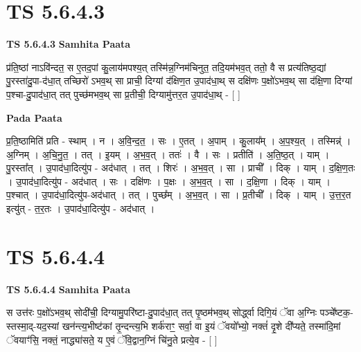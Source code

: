 \documentclass[17pt]{extarticle}
\begin{document}

\section{ TS 5.6.4.3 }

\textbf{TS 5.6.4.3 } \newline
\textbf{Samhita Paata} \newline

प्र॑ति॒ष्ठां नाऽवि॑न्दत॒ स ए॒तद॒पां कु॒लाय॑मपश्य॒त् तस्मि॑न्न॒ग्निम॑चिनुत॒ तदि॒यम॑भव॒त् ततो॒ वै स प्रत्य॑तिष्ठ॒द्यां पु॒रस्ता॑दु॒पा-द॑धा॒त् तच्छिरो॑ ऽभव॒थ् सा प्राची॒ दिग्यां द॑क्षिण॒त उ॒पाद॑धा॒थ् स दक्षि॑णः प॒क्षो॑ऽभव॒थ् सा द॑क्षि॒णा दिग्यां प॒श्चा-दु॒पाद॑धा॒त् तत् पुच्छ॑मभव॒थ् सा प्र॒तीची॒ दिग्यामु॑त्तर॒त उ॒पाद॑धा॒थ् - [  ] \newline

\textbf{Pada Paata} \newline

प्र॒ति॒ष्ठामिति॑ प्रति - स्थाम् । न । अ॒वि॒न्द॒त॒ । सः । ए॒तत् । अ॒पाम् । कु॒लाय᳚म् । अ॒प॒श्य॒त् । तस्मिन्न्॑ । अ॒ग्निम् । अ॒चि॒नु॒त॒ । तत् । इ॒यम् । अ॒भ॒व॒त् । ततः॑ । वै । सः । प्रतीति॑ । अ॒ति॒ष्ठ॒त् । याम् । पु॒रस्ता᳚त् । उ॒पाद॑धा॒दित्यु॑प - अद॑धात् । तत् । शिरः॑ । अ॒भ॒व॒त् । सा । प्राची᳚ । दिक् । याम् । द॒क्षि॒ण॒तः । उ॒पाद॑धा॒दित्यु॑प - अद॑धात् । सः । दक्षि॑णः । प॒क्षः । अ॒भ॒व॒त् । सा । द॒क्षि॒णा । दिक् । याम् । प॒श्चात् । उ॒पाद॑धा॒दित्यु॑प-अद॑धात् । तत् । पुच्छ᳚म् । अ॒भ॒व॒त् । सा । प्र॒तीची᳚ । दिक् । याम् । उ॒त्त॒र॒त इत्यु॑त् - त॒र॒तः । उ॒पाद॑धा॒दित्यु॑प - अद॑धात् ।  \newline





\section{ TS 5.6.4.4 }

\textbf{TS 5.6.4.4 } \newline
\textbf{Samhita Paata} \newline

स उत्त॑रः प॒क्षो॑ऽभव॒थ् सोदी॑ची॒ दिग्यामु॒परि॑ष्टा-दु॒पाद॑धा॒त् तत् पृ॒ष्ठम॑भव॒थ् सोर्द्ध्वा दिगि॒यं ॅवा अ॒ग्निः पञ्चे᳚ष्टक॒-स्तस्मा॒द्-यद॒स्यां खन॑न्त्य॒भीष्ट॑कां तृ॒न्दन्त्य॒भि शर्क॑राꣳ॒॒ सर्वा॒ वा इ॒यं ॅवयो᳚भ्यो॒ नक्तं॑ दृ॒शे दी᳚प्यते॒ तस्मा॑दि॒मां ॅवयाꣳ॑सि॒ नक्तं॒ नाद्ध्या॑सते॒ य ए॒वं ॅवि॒द्वान॒ग्निं चि॑नु॒ते प्रत्ये॒व - [  ] \newline
\end{document}
